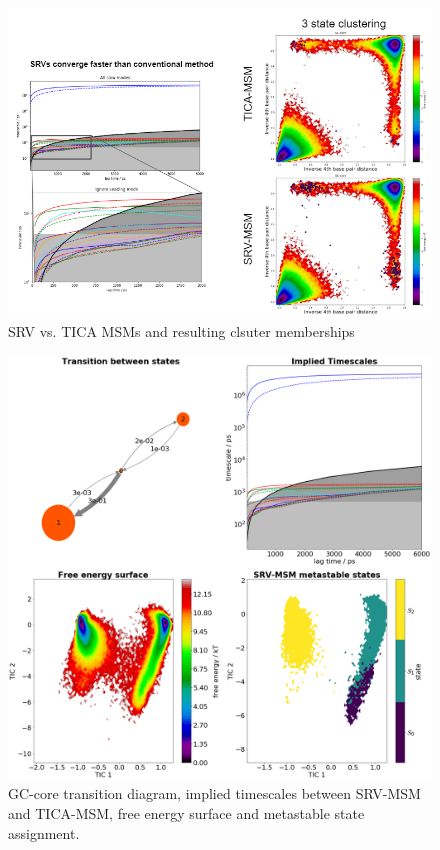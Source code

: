\documentclass[journal=jpcbfk,manuscript=article]{achemso}
\begin{document}
\begin{figure}[ht!]
	\begin{center}
        \includegraphics[width=\textwidth]{Figs/skeleton/tica_comparison_GC-core.PNG}
        \caption{SRV vs. TICA MSMs and resulting clsuter memberships}
        \label{fig:tica_comparison}
	\end{center}
\end{figure}

\begin{figure}[ht!]
	\begin{center}
        \includegraphics[width=\textwidth]{Figs/skeleton/GC-core_vis.png}
        \caption{GC-core transition diagram, implied timescales between SRV-MSM and TICA-MSM, free energy surface and metastable state assignment.}
        \label{fig:sample_fray}
	\end{center}
\end{figure}
\end{document}
